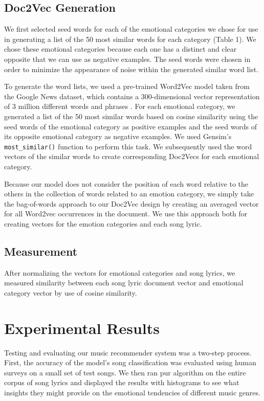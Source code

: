 \documentclass[10pt,twocolumn]{article}
\begin{document}
\subsection{Doc2Vec Generation}
We first selected seed words for each of the emotional categories we chose for use in generating a list of the 50 most similar words for each category (Table 1).  We chose these emotional categories because each one has a distinct and clear opposite that we can use as negative examples.  The seed words were chosen in order to minimize the appearance of noise within the generated similar word list.

To generate the word lists, we used a pre-trained Word2Vec model taken from the Google News dataset, which contains a 300-dimensional vector representation of 3 million different words and phrases \cite{a17}.  For each emotional category, we generated a list of the 50 most similar words based on cosine similarity using the seed words of the emotional category as positive examples and the seed words of its opposite emotional category as negative examples.  We used Gensim's \texttt{most\_similar()} function to perform this task.  We subsequently used the word vectors of the similar words to create corresponding Doc2Vecs for each emotional category.

Because our model does not consider the position of each word relative to the others in the collection of words related to an emotion category, we simply take the bag-of-words approach to our Doc2Vec design by creating an averaged vector for all Word2vec occurrences in the document.  We use this approach both for creating vectors for the emotion categories and each song lyric.

\subsection{Measurement}

After normalizing the vectors for emotional categories and song lyrics, we measured similarity between each song lyric document vector and emotional category vector by use of cosine similarity.

\section{Experimental Results}
Testing and evaluating our music recommender system was a two-step process. First, the accuracy of the model's song classification was evaluated using human surveys on a small set of test songs. We then ran pur algorithm on the entire corpus of song lyrics and displayed the results with histograms to see what insights they might provide on the emotional tendencies of different music genres.
\end{document}

